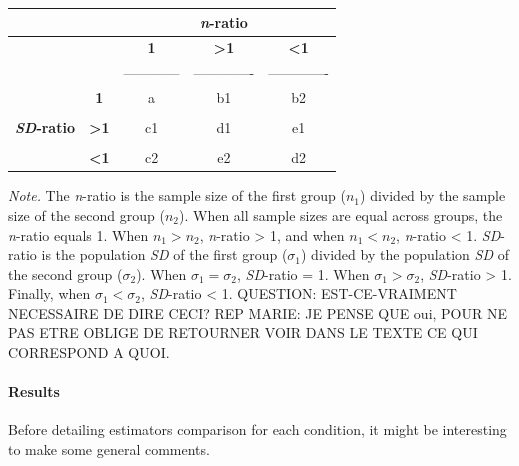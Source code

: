 \documentclass[
  man,floatsintext]{apa6}
\begin{document}
\begin{longtable}[]{@{}ccccc@{}}
\toprule
& & & \textbf{\emph{n}-ratio} &\tabularnewline
\midrule
\endhead
& & \textbf{1} & \textbf{\textgreater1} & \textbf{\textless1}\tabularnewline
& & ------------ & ------------- & -------------\tabularnewline
& \textbf{1} & a & b1 & b2\tabularnewline
& & & &\tabularnewline
\textbf{\emph{SD}-ratio} & \textbf{\textgreater1} & c1 & d1 & e1\tabularnewline
& & & &\tabularnewline
& \textbf{\textless1} & c2 & e2 & d2\tabularnewline
\bottomrule
\end{longtable}

\emph{Note.} The \emph{n}-ratio is the sample size of the first group (\(n_1\)) divided by the sample size of the second group (\(n_2\)). When all sample sizes are equal across groups, the \emph{n}-ratio equals 1. When \(n_1 > n_2\), \emph{n}-ratio \textgreater{} 1, and when \(n_1 < n_2\), \emph{n}-ratio \textless{} 1. \emph{SD}-ratio is the population \emph{SD} of the first group (\(\sigma_1\)) divided by the population \emph{SD} of the second group (\(\sigma_2\)). When \(\sigma_1=\sigma_2\), \emph{SD}-ratio = 1. When \(\sigma_1>\sigma_2\), \emph{SD}-ratio \textgreater{} 1. Finally, when \(\sigma_1<\sigma_2\), \emph{SD}-ratio \textless{} 1.
QUESTION: EST-CE-VRAIMENT NECESSAIRE DE DIRE CECI? REP MARIE: JE PENSE QUE oui, POUR NE PAS ETRE OBLIGE DE RETOURNER VOIR DANS LE TEXTE CE QUI CORRESPOND A QUOI.

\hypertarget{results}{%
\paragraph{Results}\label{results}}

Before detailing estimators comparison for each condition, it might be interesting to make some general comments.
\end{document}
